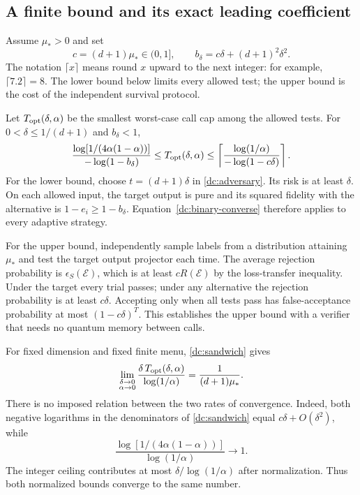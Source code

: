 \documentclass[11pt,a4paper]{article}
\numberwithin{equation}{section}
\begin{document}
\subsection{A finite bound and its exact leading coefficient}

Assume $\mu_*>0$ and set
\[
 c=(d+1)\mu_*\in(0,1],\qquad
 b_\delta=c\delta+(d+1)^2\delta^2.
\]
The notation $\lceil x\rceil$ means round $x$ upward to the next integer:
for example, $\lceil 7.2\rceil=8$. The lower bound below limits every allowed
test; the upper bound is the cost of the independent survival protocol.

Let $T_{\rm opt}(\delta,\alpha)$ be the smallest worst-case call cap
among the allowed tests.  For $0<\delta\leq1/(d+1)$ and $b_\delta<1$,
\begin{equation}
 \frac{\log[1/(4\alpha(1-\alpha))]}{-\log(1-b_\delta)}
 \leq T_{\rm opt}(\delta,\alpha)
 \leq\left\lceil
 \frac{\log(1/\alpha)}{-\log(1-c\delta)}
 \right\rceil.
 \label{dc:sandwich}
\end{equation}
For the lower bound, choose $t=(d+1)\delta$ in
\eqref{dc:adversary}.  Its risk is at least $\delta$.  On each allowed
input, the target output is pure and its squared fidelity with the
alternative is $1-e_i\geq1-b_\delta$.  Equation~\eqref{dc:binary-converse}
therefore applies to every adaptive strategy.

For the upper bound, independently sample labels from a distribution
attaining $\mu_*$ and test the target output projector each time.  The
average rejection probability is $\epsilon_S(\mathcal E)$, which is
at least $cR(\mathcal E)$ by the loss-transfer inequality.  Under the target
every trial passes; under any alternative the rejection probability is at
least $c\delta$.  Accepting only when all tests pass has false-acceptance
probability at most $(1-c\delta)^T$.  This establishes the upper bound
with a verifier that needs no quantum memory between calls.

For fixed dimension and fixed finite menu, \eqref{dc:sandwich} gives
\begin{equation}
 \lim_{\substack{\delta\to0\\\alpha\to0}}
 \frac{\delta\,T_{\rm opt}(\delta,\alpha)}{\log(1/\alpha)}
 =\frac1{(d+1)\mu_*}.
 \label{dc:joint-limit}
\end{equation}
There is no imposed relation between the two rates of convergence.
Indeed, both negative logarithms in the denominators of
\eqref{dc:sandwich} equal $c\delta+O(\delta^2)$, while
\[
 \frac{\log[1/(4\alpha(1-\alpha))]}{\log(1/\alpha)}\longrightarrow1.
\]
The integer ceiling contributes at most $\delta/\log(1/\alpha)$ after
normalization.  Thus both normalized bounds converge to the same number.
\end{document}
